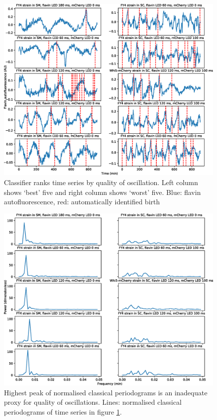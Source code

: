 \begin{figure}[htbp]
  \centering
  \includegraphics[width=\textwidth]{10m_ClassifierBestWorstTS}
  \caption{Classifier ranks time series by quality of oscillation.
    Left column shows `best' five and right column shows `worst' five.
    Blue: flavin autofluorescence, red: automatically identified birth}
  \label{fig:ClassifierBestWorstTS}
\end{figure}

\begin{figure}[htbp]
  \centering
  \includegraphics[width=\textwidth]{10m_ClassifierBestWorstPS}
  \caption{Highest peak of normalised classical periodograms is an inadequate proxy for quality of oscillations.
    Lines: normalised classical periodograms of time series in figure \ref{fig:ClassifierBestWorstTS}.}
  \label{fig:ClassifierBestWorstPS}
\end{figure}


